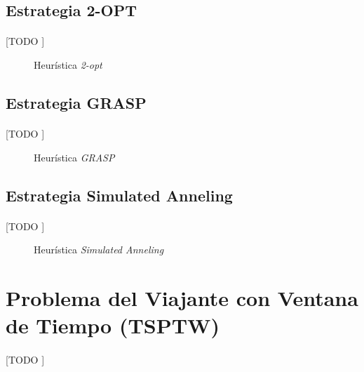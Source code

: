 \documentclass[spanish]{article}
\begin{document}
		\subsection{Estrategia 2-OPT}

			\paragraph{}
			[TODO ]

			\begin{figure}
	      \centering
	      \caption{Heurística \emph{2-opt}}
	      \label{code:tsp-2-opt}
	    \end{figure}

		\subsection{Estrategia GRASP}

			\paragraph{}
			[TODO ]

			\begin{figure}
				\centering
				\caption{Heurística \emph{GRASP}}
				\label{code:tsp-grasp}
			\end{figure}

		\subsection{Estrategia Simulated Anneling}

			\paragraph{}
			[TODO ]

			\begin{figure}
	      \centering
				\caption{Heurística \emph{Simulated Anneling}}
	      \label{code:tsp-simulated-anneling}
	    \end{figure}

	\section{Problema del Viajante con Ventana de Tiempo (TSPTW)}

		\paragraph{}
		[TODO ]
\end{document}
